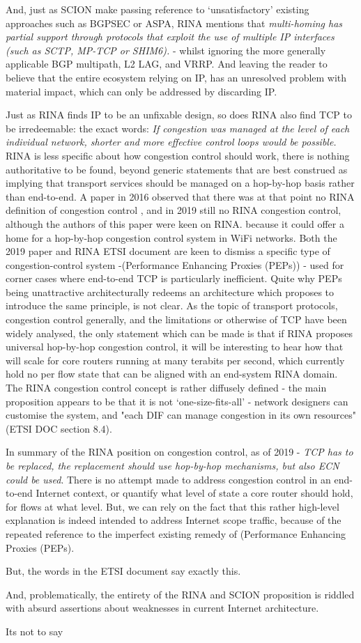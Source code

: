 And, just as SCION make passing reference to  `unsatisfactory' existing approaches such as BGPSEC or ASPA, RINA mentions that \emph{multi-homing has partial support through protocols that exploit the use of multiple IP interfaces (such as SCTP, MP-TCP or SHIM6).} - whilst ignoring the more generally applicable BGP multipath, L2 LAG, and VRRP.
And leaving the reader to believe that the entire ecosystem relying on IP, has an unresolved problem with material impact, which can only be addressed by discarding IP.

Just as RINA finds IP to be an unfixable design, so does RINA also find TCP to be irredeemable: the exact words: \emph{If congestion was managed at the level of each individual network, shorter and more effective control loops would be possible.}
RINA is less specific about how congestion control should work, there is nothing authoritative to be found, beyond generic statements that are best construed as implying that transport services should be managed on a hop-by-hop basis rather than end-to-end.  A paper in 2016\cite{teymoori2016} observed that there was at that point no RINA definition of congestion control , and in 2019 still no RINA congestion control, although the authors of this paper \cite{hiorth2019} were keen on RINA. because it could offer a home for a hop-by-hop congestion control system in WiFi networks.
Both the 2019 paper and RINA ETSI document are keen to dismiss a specific type of congestion-control system   -(Performance Enhancing Proxies (PEPs)) -  used for corner cases where end-to-end TCP is particularly inefficient.  Quite why PEPs being unattractive architecturally redeems an architecture which proposes to introduce the same principle, is not clear.
As the topic of transport protocols, congestion control generally, and the limitations or otherwise of TCP have been widely analysed, the only statement which can be made is that if RINA proposes universal hop-by-hop congestion control, it will be interesting to hear how that will scale for core routers running at many terabits per second, which currently hold no per flow state that can be aligned with an end-system RINA domain.  The RINA congestion control concept is rather diffusely defined - the main proposition appears to be that it is not `one-size-fits-all' - network designers can customise the system, and "each DIF can manage congestion in its own resources" (ETSI DOC section 8.4).

In summary of the RINA position on congestion control, as of 2019 - \emph{TCP has to be replaced, the replacement should use hop-by-hop mechanisms, but also ECN could be used}.  There is no attempt made to address congestion control in an end-to-end Internet context, or quantify what level of state a core router should hold, for flows at what level.  But, we can rely on the fact that this rather high-level explanation is indeed intended to address Internet scope traffic, because of the repeated reference to the imperfect existing remedy of (Performance Enhancing Proxies (PEPs).

But, the words in the ETSI document say exactly this.

And, problematically, the entirety of the RINA and SCION proposition is riddled with absurd assertions about weaknesses in current Internet architecture.

Its not to say

